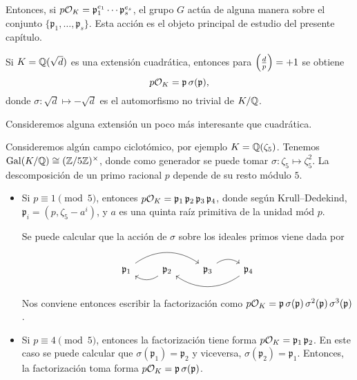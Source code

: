 Entonces, si $p\mathcal{O}_K = \mathfrak{p}_1^{e_1}\cdots\mathfrak{p}_s^{e_s}$,
el grupo $G$ actúa de alguna manera sobre el conjunto
$\{ \mathfrak{p}_1, \ldots, \mathfrak{p}_s \}$. Esta acción es el objeto
principal de estudio del presente capítulo.

\begin{ejemplo}
  Si $K = \mathbb{Q} (\sqrt{d})$ es una extensión cuadrática, entonces para
  $\left(\frac{d}{p}\right) = +1$ se obtiene
  $$p\mathcal{O}_K = \mathfrak{p} \, \sigma (\mathfrak{p}),$$
  donde $\sigma\colon \sqrt{d} \mapsto -\sqrt{d}$ es el automorfismo no trivial
  de $K/\mathbb{Q}$.
\end{ejemplo}

Consideremos alguna extensión un poco más interesante que cuadrática.

\begin{ejemplo}
  Consideremos algún campo ciclotómico, por ejemplo $K = \mathbb{Q} (\zeta_5)$.
  Tenemos $\operatorname{Gal} (K/\mathbb{Q}) \cong (\mathbb{Z}/5\mathbb{Z})^\times$, donde como generador se puede
  tomar $\sigma\colon \zeta_5 \mapsto \zeta_5^2$. La descomposición de un primo
  racional $p$ depende de su resto módulo $5$.

  \begin{itemize}
  \item Si $p \equiv 1 \pmod{5}$, entonces
    $p\mathcal{O}_K = \mathfrak{p}_1\,\mathfrak{p}_2\,\mathfrak{p}_3\,\mathfrak{p}_4$,
    donde según Krull--Dedekind, $\mathfrak{p}_i = (p, \zeta_5 - a^i)$, y
    $a$ es una quinta raíz primitiva de la unidad mód $p$.
\iffalse
    Tenemos,
    por ejemplo,
    $$\sigma \mathfrak{p}_1 = (p, \zeta_5^2 - a) = \mathfrak{p}_3 = (p, \zeta_5 - a^3).$$
    De hecho,
    $$(\zeta_5 + a^3)\,(\zeta_5 - a^3) \equiv \zeta_5^2 - a \pmod{p},$$
    así que $\zeta_5^2 - a \in \mathfrak{p}_3$. Entonces,
    $\sigma\mathfrak{p}_1 \subseteq \mathfrak{p}_3$, y luego
    $\sigma\mathfrak{p}_1 = \mathfrak{p}_3$ por la maximalidad.
    De manera similar podemos ver qué sucede con otros ideales, y concluir que
\fi
    Se puede calcular que la acción de $\sigma$ sobre los ideales primos viene
    dada por
    \[ \begin{tikzcd}
      \mathfrak{p}_1\ar[bend left=35]{rr} & \mathfrak{p}_2\ar[bend left=35]{l} & \mathfrak{p}_3\ar[bend left=35]{r} & \mathfrak{p}_4\ar[bend left=35]{ll}
    \end{tikzcd} \]
    Nos conviene entonces escribir la factorización como
    $p\mathcal{O}_K = \mathfrak{p}\,\sigma(\mathfrak{p})\,\sigma^2(\mathfrak{p})\,\sigma^3(\mathfrak{p})$.

  \item Si $p \equiv 4 \pmod{5}$, entonces la factorización tiene forma
    $p\mathcal{O}_K = \mathfrak{p}_1\,\mathfrak{p}_2$. En este caso se puede calcular
    que $\sigma (\mathfrak{p}_1) = \mathfrak{p}_2$ y viceversa,
    $\sigma (\mathfrak{p}_2) = \mathfrak{p}_1$. Entonces, la factorización
    toma forma $p\mathcal{O}_K = \mathfrak{p}\,\sigma(\mathfrak{p})$.


\end{itemize}
\end{ejemplo}
